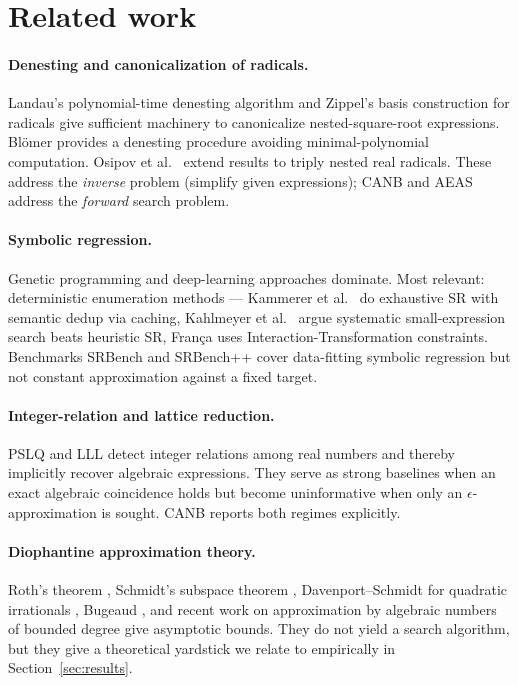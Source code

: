 \documentclass[11pt]{article}
\begin{document}
\section{Related work}
\label{sec:related}

\paragraph{Denesting and canonicalization of radicals.} Landau's polynomial-time denesting algorithm \cite{landau89,landau91} and Zippel's basis construction for radicals \cite{zippel85} give sufficient machinery to canonicalize nested-square-root expressions. Blömer \cite{blomer92} provides a denesting procedure avoiding minimal-polynomial computation. Osipov et al.~\cite{osipov21} extend results to triply nested real radicals. These address the \emph{inverse} problem (simplify given expressions); CANB and AEAS address the \emph{forward} search problem.

\paragraph{Symbolic regression.} Genetic programming \cite{koza92, schmidt09} and deep-learning approaches \cite{udrescu20feynman, petersen21, biggio21, kamienny23, shojaee23} dominate. Most relevant: deterministic enumeration methods — Kammerer et al.~\cite{kammerer21} do exhaustive SR with semantic dedup via caching, Kahlmeyer et al.~\cite{kahlmeyer24} argue systematic small-expression search beats heuristic SR, França \cite{franca18} uses Interaction-Transformation constraints. Benchmarks SRBench \cite{lacava21srbench} and SRBench++ \cite{franca24srbenchpp} cover data-fitting symbolic regression but not constant approximation against a fixed target.

\paragraph{Integer-relation and lattice reduction.} PSLQ \cite{ferguson99,bailey01pslq} and LLL \cite{lll82} detect integer relations among real numbers and thereby implicitly recover algebraic expressions. They serve as strong baselines when an exact algebraic coincidence holds but become uninformative when only an $\epsilon$-approximation is sought. CANB reports both regimes explicitly.

\paragraph{Diophantine approximation theory.} Roth's theorem \cite{roth55}, Schmidt's subspace theorem \cite{schmidt75}, Davenport--Schmidt for quadratic irrationals \cite{davenport67}, Bugeaud \cite{bugeaud04}, and recent work on approximation by algebraic numbers of bounded degree \cite{schleischitz18, poels25} give asymptotic bounds. They do not yield a search algorithm, but they give a theoretical yardstick we relate to empirically in Section~\ref{sec:results}.
\end{document}
